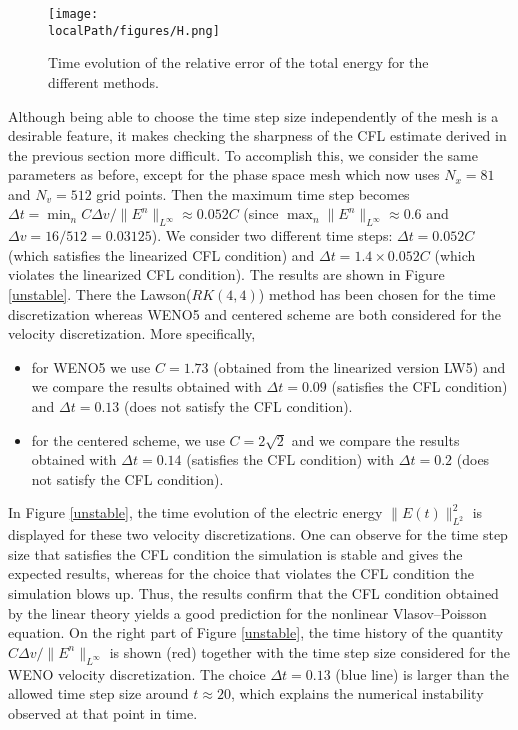 \begin{figure}%
	\centering
  \texttt{[image: \\localPath/figures/H.png]}
	\caption{Time evolution of the relative error of the total energy for the different methods. }
	\label{total_energy}
\end{figure}

Although being able to choose the time step size independently of the mesh is a desirable feature, it makes checking the sharpness of the CFL estimate derived in the previous section more difficult. To accomplish this, we consider the same parameters as before, except for the phase space mesh which now uses $N_x=81$ and $N_v=512$ grid points.  Then the maximum time step becomes $\Delta t=\min_n C\Delta v/\|E^n\|_{L^\infty} \approx 0.052C$ (since $\max_n \|E^n\|_{L^\infty}\approx 0.6$ and $\Delta v=16/512=0.03125$). We consider two different time steps:  $\Delta t=0.052C$ (which satisfies the linearized CFL condition) and $\Delta t = 1.4 \times 0.052C$ (which violates the linearized CFL condition). The results are shown in Figure \ref{unstable}. There the Lawson($RK(4,4)$) method has been chosen for the time discretization whereas WENO5 and centered scheme are both considered for the velocity discretization. More specifically,
\begin{itemize}
    \item for WENO5 we use $C=1.73$ (obtained from the linearized version LW5) and we compare the results obtained 
    with $\Delta t=0.09$ (satisfies the CFL condition) and $\Delta t=0.13$ (does not satisfy the CFL condition). 
    \item for the centered scheme, we use $C=2\sqrt{2}$ and we compare the results obtained with $\Delta t=0.14$ (satisfies the CFL condition) with $\Delta t=0.2$ (does not satisfy the CFL condition). 
\end{itemize}
In Figure \ref{unstable}, the time evolution of the electric energy $\|E(t)\|^2_{L^2}$ is displayed for these two velocity discretizations. One can observe for the time step size that satisfies the CFL condition the simulation is stable and gives the expected results, whereas for the choice that violates the CFL condition the simulation blows up. Thus, the results confirm that the CFL condition obtained by the linear theory yields a good prediction for the nonlinear Vlasov--Poisson equation. On the right part of Figure \ref{unstable}, the time history of the quantity $C \Delta v/ \|E^n\|_{L^\infty}$ is shown (red) together with the time step size considered for the WENO velocity discretization. The choice $\Delta t=0.13$ (blue line) is larger than the allowed time step size around $t\approx 20$, which explains the numerical instability observed at that point in time. 

